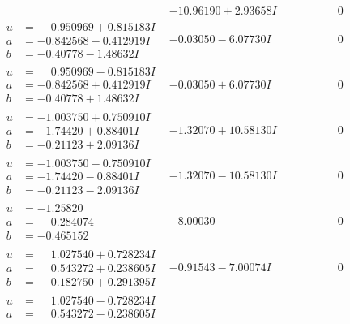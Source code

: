 \documentclass[1p]{elsarticle_modified}
\theoremstyle{definition}
\begin{document}
$$\begin{array}{c|c|c}
 & -10.96190 + 2.93658 I & \phantom{-0.000000 } 0 \\ \hline\begin{aligned}
u &= \phantom{-}0.950969 + 0.815183 I \\
a &= -0.842568 - 0.412919 I \\
b &= -0.40778 - 1.48632 I\end{aligned}
 & -0.03050 - 6.07730 I & \phantom{-0.000000 } 0 \\ \hline\begin{aligned}
u &= \phantom{-}0.950969 - 0.815183 I \\
a &= -0.842568 + 0.412919 I \\
b &= -0.40778 + 1.48632 I\end{aligned}
 & -0.03050 + 6.07730 I & \phantom{-0.000000 } 0 \\ \hline\begin{aligned}
u &= -1.003750 + 0.750910 I \\
a &= -1.74420 + 0.88401 I \\
b &= -0.21123 + 2.09136 I\end{aligned}
 & -1.32070 + 10.58130 I & \phantom{-0.000000 } 0 \\ \hline\begin{aligned}
u &= -1.003750 - 0.750910 I \\
a &= -1.74420 - 0.88401 I \\
b &= -0.21123 - 2.09136 I\end{aligned}
 & -1.32070 - 10.58130 I & \phantom{-0.000000 } 0 \\ \hline\begin{aligned}
u &= -1.25820\phantom{ +0.000000I} \\
a &= \phantom{-}0.284074\phantom{ +0.000000I} \\
b &= -0.465152\phantom{ +0.000000I}\end{aligned}
 & -8.00030\phantom{ +0.000000I} & \phantom{-0.000000 } 0 \\ \hline\begin{aligned}
u &= \phantom{-}1.027540 + 0.728234 I \\
a &= \phantom{-}0.543272 + 0.238605 I \\
b &= \phantom{-}0.182750 + 0.291395 I\end{aligned}
 & -0.91543 - 7.00074 I & \phantom{-0.000000 } 0 \\ \hline\begin{aligned}
u &= \phantom{-}1.027540 - 0.728234 I \\
a &= \phantom{-}0.543272 - 0.238605 I \\

\end{aligned}
\end{array}$$
\end{document}

